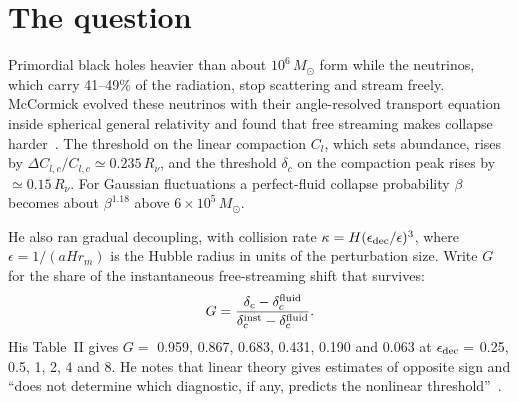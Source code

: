 \documentclass[11pt]{article}
\begin{document}
\begin{abstract}
from $r=1/16$ to $16$ show that the surviving share is not set by the connection energy, which is stationary at $r=1$, but by the reflection coefficient of the flux--shear link, $\Gamma_{12}=(\kappa_2-\kappa_1)/(\kappa_2+\kappa_1)$: $G$ runs from $0.776$ to $0.129$, and its offset $\ln[(1-G)/G]$ moves in a straight line with the link rapidity $\tfrac12\ln r$. Near the matched link its rate is $1.116\pm0.004$, against $c_0/c_1=\sqrt{5/4}=1.118$, the ratio of the two link weights; the frozen memory form misses this effect entirely. Halving the neutrino fraction to $R_\nu=0.2$ leaves $G$ at $0.409$, against $0.425$ at $R_\nu=0.409$ measured with the same code. The algebraic identities, the counterexample and the verdict arithmetic are machine-checked in Lean (Appendix~C). Two further tests are stated for the e$^\pm$ annihilation epoch and for the mean of the rates.
\end{abstract}

\section{The question}

Primordial black holes heavier than about $10^6\,M_\odot$ form while the neutrinos, which carry 41--49\% of the radiation, stop scattering and stream freely. McCormick evolved these neutrinos with their angle-resolved transport equation inside spherical general relativity and found that free streaming makes collapse harder~\cite{McC}. The threshold on the linear compaction $C_l$, which sets abundance, rises by $\Delta C_{l,c}/C_{l,c}\simeq0.235\,R_\nu$, and the threshold $\delta_c$ on the compaction peak rises by $\simeq0.15\,R_\nu$. For Gaussian fluctuations a perfect-fluid collapse probability $\beta$ becomes about $\beta^{1.18}$ above $6\times10^5\,M_\odot$.

He also ran gradual decoupling, with collision rate $\kappa=H(\epsilon_{\rm dec}/\epsilon)^3$, where $\epsilon=1/(aHr_m)$ is the Hubble radius in units of the perturbation size. Write $G$ for the share of the instantaneous free-streaming shift that survives:
\begin{equation}
G=\frac{\delta_c-\delta_c^{\rm fluid}}{\delta_c^{\rm inst}-\delta_c^{\rm fluid}}.
\end{equation}
His Table~II gives $G=$ 0.959, 0.867, 0.683, 0.431, 0.190 and 0.063 at $\epsilon_{\rm dec}=$ 0.25, 0.5, 1, 2, 4 and 8. He notes that linear theory gives estimates of opposite sign and ``does not determine which diagnostic, if any, predicts the nonlinear threshold''~\cite[Sec.~IV\,C]{McC}.
\end{document}
